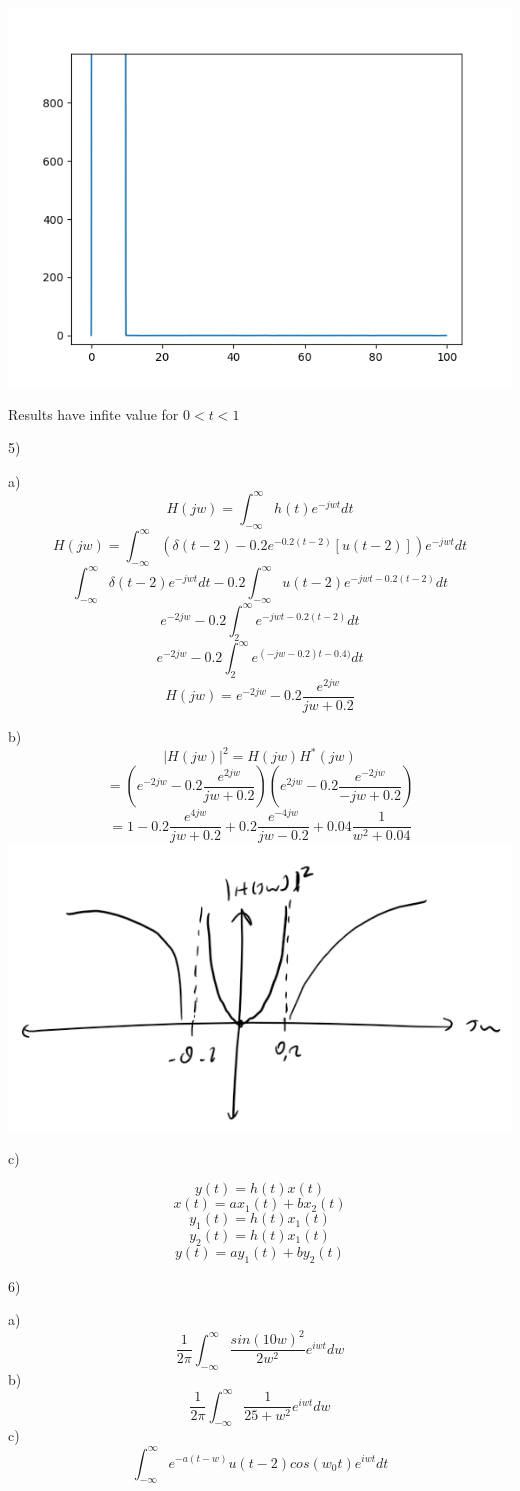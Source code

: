 \documentclass{article}
\begin{document}
	\includegraphics[scale=0.7]{q4}\par
	Results have infite value for $0<t<1$	
	\par
	 5)\par
	 a)
	 $$H(jw)=\int^{\infty}_{-\infty}h(t)e^{-jwt}dt$$
	 $$H(jw)=\int^{\infty}_{-\infty} (\delta(t-2)-0.2e^{-0.2(t-2)}[u(t-2)])e^{-jwt}dt$$
	 $$\int^{\infty}_{-\infty}\delta(t-2)e^{-jwt}dt - 0.2 \int^{\infty}_{-\infty}u(t-2)e^{-jwt-0.2(t-2)}dt $$
	 $$e^{-2jw}-0.2\int^{\infty}_{2}e^{-jwt-0.2(t-2)}dt $$
	 $$e^{-2jw}-0.2\int^{\infty}_{2}e^{(-jw-0.2)t-0.4)}dt$$
	 $$H(jw)=e^{-2jw}-0.2 \frac{e^{2jw}}{jw+0.2}$$

	 \par
	 b)
	 $$|H(jw)|^2=H(jw)H^*(jw)$$
	 $$=(e^{-2jw}-0.2 \frac{e^{2jw}}{jw+0.2})(e^{2jw}-0.2 \frac{e^{-2jw}}{-jw+0.2})$$
	 $$=1-0.2 \frac{e^{4jw}}{jw+0.2}+0.2 \frac{e^{-4jw}}{jw-0.2}+0.04\frac{1}{w^2+0.04}$$
	 \includegraphics[scale=0.7]{q5b}\par
	 
	 c)\par 
	 $$y(t)=h(t)x(t)$$
	 $$x(t)=ax_1(t)+bx_2(t)$$
	 $$y_1(t)=h(t)x_1(t)$$
	 $$ y_2(t)=h(t)x_1(t) $$
	 $$y(t)=ay_1(t)+by_2(t)$$
	 \par 
	 
	 6)\par 
	 a)
	 $$\frac{1}{2\pi} \int_{-\infty}^{\infty} \frac{sin(10w)^2}{2w^2}e^{iwt}dw$$
	 b)
	 $$\frac{1}{2\pi} \int_{-\infty}^{\infty} \frac{1}{25+w^2}e^{iwt}dw$$
	 c)
	 $$\int_{-\infty}^{\infty} e^{-a(t-w)}u(t-2)cos(w_0 t)e^{iwt}dt$$
	  
	\par
\end{document}
